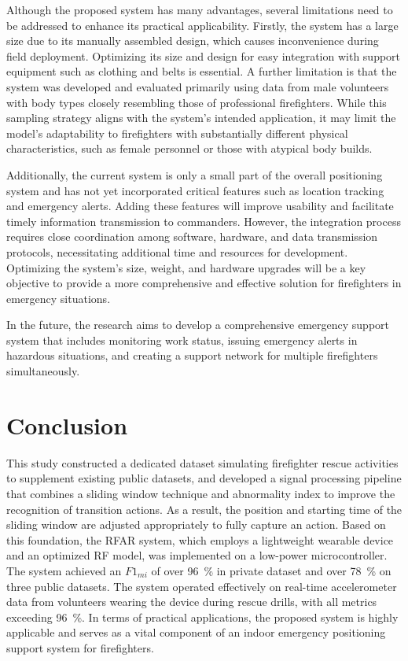 \documentclass[journal,twoside,web]{ieeecolor}
\begin{document}
Although the proposed system has many advantages, several limitations need to be addressed to enhance its practical applicability. Firstly, the system has a large size due to its manually assembled design, which causes inconvenience during field deployment. Optimizing its size and design for easy integration with support equipment such as clothing and belts is essential. A further limitation is that the system was developed and evaluated primarily using data from male volunteers with body types closely resembling those of professional firefighters. While this sampling strategy aligns with the system’s intended application, it may limit the model’s adaptability to firefighters with substantially different physical characteristics, such as female personnel or those with atypical body builds.

Additionally, the current system is only a small part of the overall positioning system and has not yet incorporated critical features such as location tracking and emergency alerts. Adding these features will improve usability and facilitate timely information transmission to commanders. However, the integration process requires close coordination among software, hardware, and data transmission protocols, necessitating additional time and resources for development. Optimizing the system's size, weight, and hardware upgrades will be a key objective to provide a more comprehensive and effective solution for firefighters in emergency situations. 

In the future, the research aims to develop a comprehensive emergency support system that includes monitoring work status, issuing emergency alerts in hazardous situations, and creating a support network for multiple firefighters simultaneously.
\section{Conclusion}\label{Conclusion}

This study constructed a dedicated dataset simulating firefighter rescue activities to supplement existing public datasets, and developed a signal processing pipeline that combines a sliding window technique and abnormality index to improve the recognition of transition actions. As a result, the position and starting time of the sliding window are adjusted appropriately to fully capture an action. Based on this foundation, the RFAR system, which employs a lightweight wearable device and an optimized RF model, was implemented on a low-power microcontroller. The system achieved an $F1_{mi}$ of over 96~\% in private dataset and over 78~\% on three public datasets. The system operated effectively on real-time accelerometer data from volunteers wearing the device during rescue drills, with all metrics exceeding 96~\%. In terms of practical applications, the proposed system is highly applicable and serves as a vital component of an indoor emergency positioning support system for firefighters.
\end{document}
